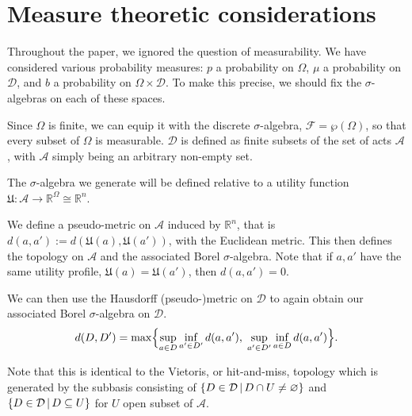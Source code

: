 \documentclass[a4paper]{article}
\newcommand\A{\mathcal{A}}
\newcommand\U{\mathfrak{U}} %
\newcommand{\Decs}{\mathcal{D}}
\renewcommand{\Re}{\mathbb{R}}
\renewcommand{\color}[1]{}
\newenvironment{colored}[1]{\leavevmode\color{#1}}{}
\newcommand\SetDelimiter[1][]{
	\nonscript\,#1\vert \allowbreak \nonscript\,\mathopen{}}
\providecommand\given{\SetDelimiter}
\renewcommand{\emptyset}{\varnothing}
\newenvironment{CCM rewritten}
{\begingroup\color{blue}} %
{\endgroup}              %
\begin{document}
\begin{colored}{violet}
	

	
	\section{Measure theoretic considerations}\label{sect:appendix:measure}
	Throughout the paper, we ignored the question of measurability. We have considered various probability measures: $p$ a probability on $\Omega$, $\mu$ a probability on $\Decs$, and $b$ a probability on $\Omega\times\Decs$. To make this precise, we should fix the $\sigma$-algebras on each of these spaces.
	
	Since $\Omega$ is finite, we can equip it with the discrete $\sigma$-algebra, $\mathcal{F}=\wp(\Omega)$, so that every subset of $\Omega$ is measurable. 	
	$\Decs$ is defined as finite subsets of the set of acts $\A$, with $\A$ simply being an arbitrary non-empty set. 
	
	The $\sigma$-algebra we generate will be defined relative to a utility function $\U:\A\to\Re^\Omega\cong\Re^n$. 
	
	We define a pseudo-metric on $\A$ induced by $\Re^n$, that is $d(a,a'):=d(\U(a),\U(a'))$, with the Euclidean metric. 
	This then defines the topology on $\A$ and the associated Borel $\sigma$-algebra. 
	Note that if $a,a'$ have the same utility profile, $\U(a)=\U(a')$, then $d(a,a')=0$. 
	
	We can then use the Hausdorff (pseudo-)metric on $\Decs$ to again obtain our associated Borel $\sigma$-algebra on $\Decs$.
	  \[
	d(D, D') = \max\Bigl\{
	\sup_{a \in D}\inf_{a' \in D'}d(a,a'),
	\;\sup_{a' \in D'}\inf_{a \in D}d(a,a')
	\Bigr\}.
	\]
	
	
	\begin{colored}{red}
		Note that this is identical to the Vietoris, or hit-and-miss, topology which is generated by the subbasis consisting of $\{D\in \Decs\given D\cap U\neq \emptyset\}$ and $\{D \in\Decs\given D\subseteq U\}$ for $U$ open subset of $\A$. 
	\end{colored}
	

	


\end{colored}
\end{document}
